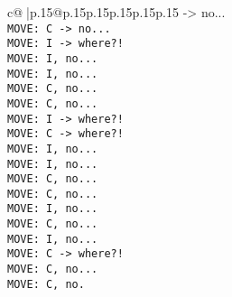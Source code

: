 \documentclass{article}
\begin{document}
{\begin{supertabular}{c@{$\;$}|p{.15\linewidth}@{}p{.15\linewidth}p{.15\linewidth}p{.15\linewidth}p{.15\linewidth}p{.15\linewidth}}
{{{ -> no...\\ \tt  MOVE: C -> no...\\ \tt  MOVE: I -> where?!\\ \tt  MOVE: I, no...\\ \tt  MOVE: I, no...\\ \tt  MOVE: C, no...\\ \tt  MOVE: C, no...\\ \tt  MOVE: I -> where?!\\ \tt  MOVE: C -> where?!\\ \tt  MOVE: I, no...\\ \tt  MOVE: I, no...\\ \tt  MOVE: C, no...\\ \tt  MOVE: C, no...\\ \tt  MOVE: I, no...\\ \tt  MOVE: C, no...\\ \tt  MOVE: I, no...\\ \tt  MOVE: C -> where?!\\ \tt  MOVE: C, no...\\ \tt  MOVE: C, no.}}}
\end{supertabular}}
\end{document}

